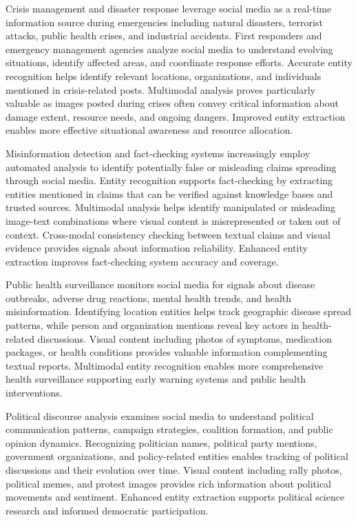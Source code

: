 \documentclass[12pt,a4paper]{report}
\begin{document}
Crisis management and disaster response leverage social media as a real-time information source during emergencies including natural disasters, terrorist attacks, public health crises, and industrial accidents. First responders and emergency management agencies analyze social media to understand evolving situations, identify affected areas, and coordinate response efforts. Accurate entity recognition helps identify relevant locations, organizations, and individuals mentioned in crisis-related posts. Multimodal analysis proves particularly valuable as images posted during crises often convey critical information about damage extent, resource needs, and ongoing dangers. Improved entity extraction enables more effective situational awareness and resource allocation.

Misinformation detection and fact-checking systems increasingly employ automated analysis to identify potentially false or misleading claims spreading through social media. Entity recognition supports fact-checking by extracting entities mentioned in claims that can be verified against knowledge bases and trusted sources. Multimodal analysis helps identify manipulated or misleading image-text combinations where visual content is misrepresented or taken out of context. Cross-modal consistency checking between textual claims and visual evidence provides signals about information reliability. Enhanced entity extraction improves fact-checking system accuracy and coverage.

Public health surveillance monitors social media for signals about disease outbreaks, adverse drug reactions, mental health trends, and health misinformation. Identifying location entities helps track geographic disease spread patterns, while person and organization mentions reveal key actors in health-related discussions. Visual content including photos of symptoms, medication packages, or health conditions provides valuable information complementing textual reports. Multimodal entity recognition enables more comprehensive health surveillance supporting early warning systems and public health interventions.

Political discourse analysis examines social media to understand political communication patterns, campaign strategies, coalition formation, and public opinion dynamics. Recognizing politician names, political party mentions, government organizations, and policy-related entities enables tracking of political discussions and their evolution over time. Visual content including rally photos, political memes, and protest images provides rich information about political movements and sentiment. Enhanced entity extraction supports political science research and informed democratic participation.
\end{document}
